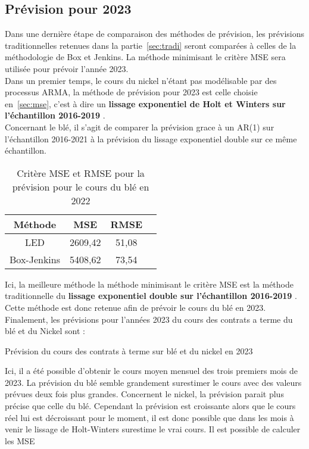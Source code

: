 \subsection{Prévision pour 2023}
Dans une dernière étape de comparaison des méthodes de prévision, les prévisions traditionnelles retenues dans la partie~\ref{sec:tradi} seront comparées à
celles de la méthodologie de Box et Jenkins. La méthode minimisant le critère MSE sera utilisée pour prévoir l'année 2023.\\[11pt]
Dans un premier temps, le cours du nickel n'étant pas modélisable par des processus ARMA, la méthode de prévision pour 2023 est celle choisie en~\ref{sec:mse}, c'est à
dire un \textbf{lissage exponentiel de Holt et Winters sur l'échantillon 2016-2019} . \\[11pt]
Concernant le blé, il s'agit de comparer la prévision grace à un AR(1) sur l'échantillon 2016-2021 à la prévision du lissage exponentiel double sur ce même échantillon.
\begin{table}[H]
    \centering
    \caption{Critère MSE et RMSE pour la prévision pour le cours du blé en 2022}
    \sffamily
    \begin{tabular}{cccc}
        \toprule
        Méthode & MSE   & RMSE \\
        \midrule
        LED &  2609,42 & 51,08  \\
        Box-Jenkins & 5408,62 & 73,54 \\
        \bottomrule
    \end{tabular}%
\end{table}
Ici, la meilleure méthode la méthode minimisant le critère MSE est la méthode traditionnelle du \textbf{lissage exponentiel double sur l'échantillon 2016-2019} . Cette 
méthode est donc retenue afin de prévoir le cours du blé en 2023.\\[11pt]
Finalement, les prévisions pour l'années 2023 du cours des contrats a terme du blé et du Nickel sont :
\begin{table}[H]
    \centering
    \caption{Prévision du cours des contrats à terme sur blé et du nickel en 2023}
    \sffamily
    
\end{table}
Ici, il a été possible d'obtenir le cours moyen mensuel des trois premiers mois de 2023. La prévision du blé semble grandement surestimer le cours avec des valeurs prévues 
deux fois plus grandes. Concernent le nickel, la prévision parait plus précise que celle du blé. Cependant la prévision est croissante alors que le cours réel 
lui est décroissant pour le moment, il est donc possible que dans les mois à venir le lissage de Holt-Winters surestime le vrai cours. Il est possible de calculer les MSE
